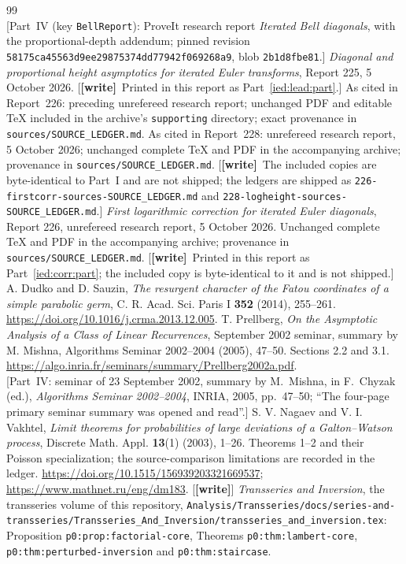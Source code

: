 \documentclass[11pt,letterpaper]{article}
\theoremstyle{remark}\newtheorem{remark}[theorem]{Remark}
\newcommand{\file}[1]{\nolinkurl{#1}}
\newcommand{\wtag}{\textup{\textbf{[write]}}}
\newcommand{\Repin}{\texttt{58175ca45563d9ee29875374dd77942f069268a9}}
\begin{document}
\begin{thebibliography}{99}
\\{}[Part~IV (key \texttt{BellReport}): ProveIt research report \emph{Iterated Bell diagonals}, with the proportional-depth addendum; pinned revision \Repin, blob \texttt{2b1d8fbe81}.]
 \emph{Diagonal and proportional height asymptotics for iterated Euler transforms}, Report 225, 5 October 2026. [\wtag\ Printed in this report as Part~\ref{ied:lead:part}.] As cited in Report~226: preceding unrefereed research report; unchanged PDF and editable TeX included in the archive's \texttt{supporting} directory; exact provenance in \texttt{sources/SOURCE\_LEDGER.md}. As cited in Report~228: unrefereed research report, 5 October 2026; unchanged complete TeX and PDF in the accompanying archive; provenance in \texttt{sources/SOURCE\_LEDGER.md}. [\wtag\ The included copies are byte-identical to Part~I and are not shipped; the ledgers are shipped as \file{226-firstcorr-sources-SOURCE_LEDGER.md} and \file{228-logheight-sources-SOURCE_LEDGER.md}.]
 \emph{First logarithmic correction for iterated Euler diagonals}, Report 226, unrefereed research report, 5 October 2026. Unchanged complete TeX and PDF in the accompanying archive; provenance in \texttt{sources/SOURCE\_LEDGER.md}. [\wtag\ Printed in this report as Part~\ref{ied:corr:part}; the included copy is byte-identical to it and is not shipped.]
 A. Dudko and D. Sauzin, \emph{The resurgent character of the Fatou coordinates of a simple parabolic germ}, C. R. Acad. Sci. Paris I \textbf{352} (2014), 255--261. \url{https://doi.org/10.1016/j.crma.2013.12.005}.
 T. Prellberg, \emph{On the Asymptotic Analysis of a Class of Linear Recurrences}, September 2002 seminar, summary by M. Mishna, Algorithms Seminar 2002--2004 (2005), 47--50. Sections 2.2 and 3.1. \url{https://algo.inria.fr/seminars/summary/Prellberg2002a.pdf}.
\\{}[Part~IV: seminar of 23 September 2002, summary by M.~Mishna, in F.~Chyzak (ed.), \emph{Algorithms Seminar 2002--2004}, INRIA, 2005, pp.~47--50; ``The four-page primary seminar summary was opened and read''.]
 S. V. Nagaev and V. I. Vakhtel, \emph{Limit theorems for probabilities of large deviations of a Galton--Watson process}, Discrete Math. Appl. \textbf{13}(1) (2003), 1--26. Theorems 1--2 and their Poisson specialization; the source-comparison limitations are recorded in the ledger. \url{https://doi.org/10.1515/156939203321669537}; \url{https://www.mathnet.ru/eng/dm183}.
 [\wtag] \emph{Transseries and Inversion}, the transseries volume of this repository, \file{Analysis/Transseries/docs/series-and-transseries/Transseries_And_Inversion/transseries_and_inversion.tex}: Proposition \texttt{p0:prop:factorial-core}, Theorems \texttt{p0:thm:lambert-core}, \texttt{p0:thm:perturbed-inversion} and \texttt{p0:thm:staircase}.

\end{thebibliography}
\end{document}
